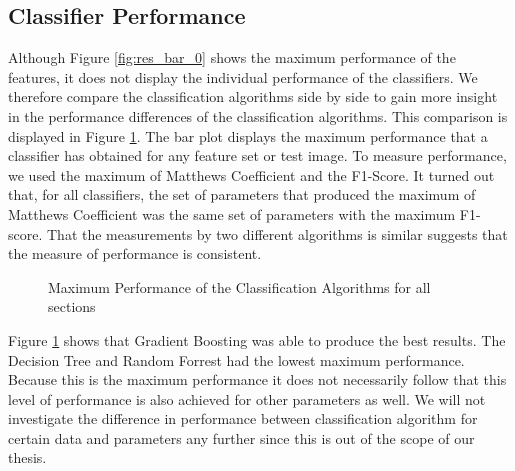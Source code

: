 \subsection{Classifier Performance}

Although Figure \ref{fig:res_bar_0} shows the maximum performance of the features, it does not display the individual performance of the classifiers. We therefore compare the classification algorithms side by side to gain more insight in the performance differences of the classification algorithms. This comparison is displayed in Figure \ref{fig:res_bar_1}. The bar plot displays the maximum performance that a classifier has obtained for any feature set or test image. To measure performance, we used the maximum of Matthews Coefficient and the F1-Score. It turned out that, for all classifiers, the set of parameters that produced the maximum of Matthews Coefficient was the same set of parameters with the maximum F1-score. That the measurements by two different algorithms is similar suggests that the measure of performance is consistent.

\dataone

\begin{figure}
	\caption{Maximum Performance of the Classification Algorithms for all sections}
	\label{fig:res_bar_1}
\end{figure}

Figure \ref{fig:res_bar_1} shows that Gradient Boosting was able to produce the best results. The Decision Tree and Random Forrest had the lowest maximum performance. Because this is the maximum performance it does not necessarily follow that this level of performance is also achieved for other parameters as well. We will not investigate the difference in performance between classification algorithm for certain data and parameters any further since this is out of the scope of our thesis.

